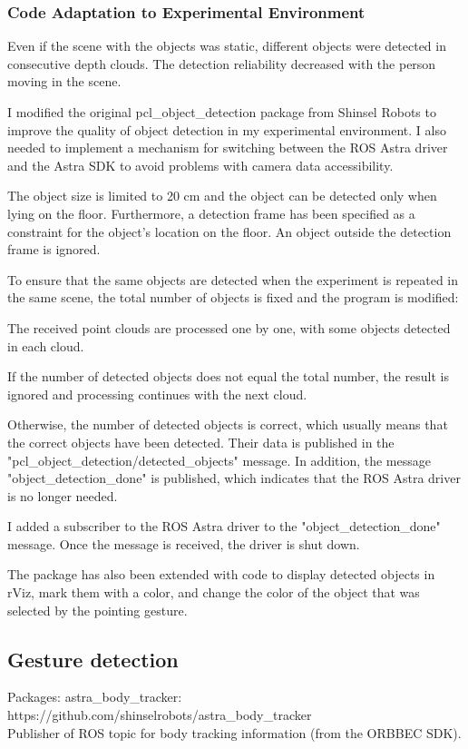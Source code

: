 \subsubsection{Code Adaptation to Experimental Environment}
Even if the scene with the objects was static, different objects were detected in consecutive depth clouds. The detection reliability decreased with the person moving in the scene.\par
I modified the original pcl\_object\_detection package from Shinsel Robots to improve the quality of object detection in my experimental environment. I also needed to implement a mechanism for switching between the ROS Astra driver and the Astra SDK to avoid problems with camera data accessibility.\par
The object size is limited to 20 cm and the object can be detected only when lying on the floor. Furthermore, a detection frame has been specified as a constraint for the object's location on the floor. An object outside the detection frame is ignored.\par
To ensure that the same objects are detected when the experiment is repeated in the same scene, the total number of objects is fixed and the program is modified:\par
The received point clouds are processed one by one, with some objects detected in each cloud. \par
If the number of detected objects does not equal the total number, the result is ignored and processing continues with the next cloud.\par
Otherwise, the number of detected objects is correct, which usually means that the correct objects have been detected. Their data is published in the "pcl\_object\_detection/detected\_objects" message. In addition, the message "object\_detection\_done" is published, which indicates that the ROS Astra driver is no longer needed.\par 
I added a subscriber to the ROS Astra driver to the "object\_detection\_done" message. Once the message is received, the driver is shut down.\par
The package has also been extended with code to display detected objects in rViz, mark them with a color, and change the color of the object that was selected by the pointing gesture.\par

\subsection{Gesture detection}
Packages: 
astra\_body\_tracker:\\
https://github.com/shinselrobots/astra\_body\_tracker\\
Publisher of ROS topic for body tracking information (from the ORBBEC SDK).\\

